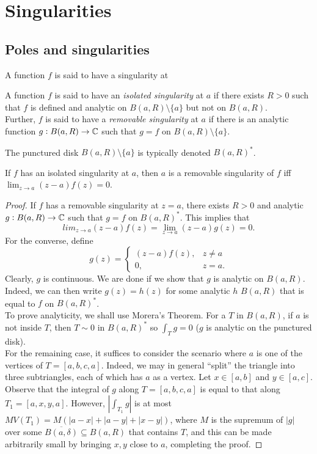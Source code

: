 \section{Singularities}

	\subsection{Poles and singularities}

		A function $f$ is said to have a singularity at 

		\begin{fdef}
			A function $f$ is said to have an \emph{isolated singularity} at $a$ if there exists $R > 0$ such that $f$ is defined and analytic on $B(a,R) \setminus \{a\}$ but not on $B(a,R)$.\\
			Further, $f$ is said to have a \emph{removable singularity} at $a$ if there is an analytic function $g : B(a,R) \to \mathbb{C}$ such that $g = f$ on $B(a,R) \setminus \{a\}$.
		\end{fdef}

		The punctured disk $B(a,R) \setminus \{a\}$ is typically denoted $B(a,R)^*$.

		\begin{theorem}
			\label{theo 3.22}
			If $f$ has an isolated singularity at $a$, then $a$ is a removable singularity of $f$ iff $\lim_{z \to a} (z-a) f(z) = 0$.
		\end{theorem}
		\begin{proof}
			If $f$ has a removable singularity at $z = a$, there exists $R > 0$ and analytic $g : B(a,R) \to \mathbb{C}$ such that $g = f$ on $B(a,R)^*$. This implies that
			\[ lim_{z\to a} (z-a) f(z) = \lim_{z \to a} (z-a) g(z) = 0. \]
			For the converse, define
			\[ g(z) =
			\begin{cases}
				(z-a) f(z), & z \ne a \\
				0, & z=a.	
			\end{cases}
			\]
			Clearly, $g$ is continuous. We are done if we show that $g$ is analytic on $B(a,R)$. Indeed, we can then write $g(z) = h(z)$ for some analytic $h$ $B(a,R)$ that is equal to $f$ on $B(a,R)^*$.\\
			To prove analyticity, we shall use Morera's Theorem. For a $T$ in $B(a,R)$, if $a$ is not inside $T$, then $T \sim 0$ in $B(a,R)^*$ so $\int_T g = 0$ ($g$ is analytic on the punctured disk).\\
			For the remaining case, it suffices to consider the scenario where $a$ is one of the vertices of $T = [a,b,c,a]$. Indeed, we may in general ``split'' the triangle into three subtriangles, each of which has $a$ as a vertex. Let $x \in [a,b]$ and $y \in [a,c]$. Observe that the integral of $g$ along $T = [a,b,c,a]$ is equal to that along $T_1 = [a,x,y,a]$. However, $\left| \int_{T_1} g \right|$ is at most $M V(T_1) = M (|a-x| + |a-y| + |x-y|)$, where $M$ is the supremum of $|g|$ over some $\overline{B(a,\delta)} \subseteq B(a,R)$ that contains $T$, and this can be made arbitrarily small by bringing $x,y$ close to $a$, completing the proof.
		\end{proof}

